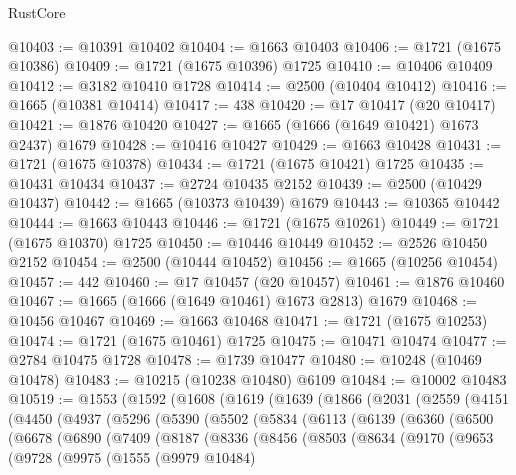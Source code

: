 \begin{lexlean}{RustCore}
\begin{coremodule}
@10403 := @10391 @10402
@10404 := @1663 @10403
@10406 := @1721 (@1675 @10386)
@10409 := @1721 (@1675 @10396) @1725
@10410 := @10406 @10409
@10412 := @3182 @10410 @1728
@10414 := @2500 (@10404 @10412)
@10416 := @1665 (@10381 @10414)
@10417 := 438
@10420 := @17 @10417 (@20 @10417)
@10421 := @1876 @10420
@10427 := @1665 (@1666 (@1649 @10421) @1673 @2437) @1679
@10428 := @10416 @10427
@10429 := @1663 @10428
@10431 := @1721 (@1675 @10378)
@10434 := @1721 (@1675 @10421) @1725
@10435 := @10431 @10434
@10437 := @2724 @10435 @2152
@10439 := @2500 (@10429 @10437)
@10442 := @1665 (@10373 @10439) @1679
@10443 := @10365 @10442
@10444 := @1663 @10443
@10446 := @1721 (@1675 @10261)
@10449 := @1721 (@1675 @10370) @1725
@10450 := @10446 @10449
@10452 := @2526 @10450 @2152
@10454 := @2500 (@10444 @10452)
@10456 := @1665 (@10256 @10454)
@10457 := 442
@10460 := @17 @10457 (@20 @10457)
@10461 := @1876 @10460
@10467 := @1665 (@1666 (@1649 @10461) @1673 @2813) @1679
@10468 := @10456 @10467
@10469 := @1663 @10468
@10471 := @1721 (@1675 @10253)
@10474 := @1721 (@1675 @10461) @1725
@10475 := @10471 @10474
@10477 := @2784 @10475 @1728
@10478 := @1739 @10477
@10480 := @10248 (@10469 @10478)
@10483 := @10215 (@10238 @10480) @6109
@10484 := @10002 @10483
@10519 := @1553
    (@1592
      (@1608
        (@1619
          (@1639
            (@1866
              (@2031
                (@2559
                  (@4151
                    (@4450
                      (@4937
                        (@5296
                          (@5390
                            (@5502
                              (@5834
                                (@6113
                                  (@6139
                                    (@6360
                                      (@6500
                                        (@6678
                                          (@6890
                                            (@7409
                                              (@8187
                                                (@8336
                                                  (@8456
                                                    (@8503
                                                      (@8634
                                                        (@9170
                                                          (@9653
                                                            (@9728
                                                              (@9975
                                                                (@1555
                                                                  (@9979 @10484)

\end{coremodule}
\end{lexlean}
